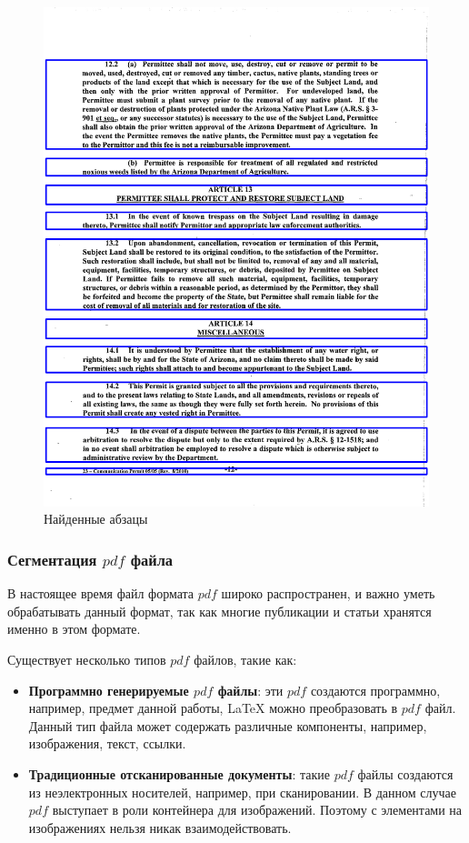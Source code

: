 \begin{figure}
    \includegraphics[scale=0.2]{img/paragraph/out.png}
    \caption{Найденные абзацы}
    \label{segmentation_output}
\end{figure}

\subsubsection{Сегментация $pdf$ файла}
В настоящее время файл формата $pdf$ широко распространен, и важно уметь обрабатывать данный формат, так как многие публикации и статьи хранятся именно в этом формате.

Существует несколько типов $pdf$ файлов, такие как:
\begin{itemize}
    \item \textbf{Программно генерируемые $pdf$ файлы}: эти $pdf$ создаются программно, например, предмет данной работы, \LaTeX\; можно преобразовать в $pdf$ файл. Данный тип файла может содержать различные компоненты, например, изображения, текст, ссылки.
    \item \textbf{Традиционные отсканированные документы}: такие $pdf$ файлы создаются из неэлектронных носителей, например, при сканировании. В данном случае $pdf$ выступает в роли контейнера для изображений. Поэтому с элементами на изображениях нельзя никак взаимодействовать.
\end{itemize}

